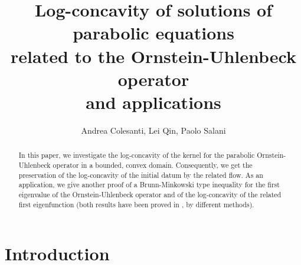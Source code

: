 \documentclass[12pt]{amsart}
\newcommand{\1}{\mathbf 1}
\begin{document}
\title[]{Log-concavity of solutions of parabolic equations\\ related to the Ornstein-Uhlenbeck operator\\ and applications}


\author[Andrea Colesanti, Lei Qin, Paolo Salani ]{Andrea Colesanti, Lei Qin, Paolo Salani}
\address{Dipartimento di Matematica e Informatica ``U. Dini", Universit\`a degli Studi di Firenze}
\address{Institute of Mathematics,
Hunan University, Changsha, 410082, China}
\address{Dipartimento di Matematica e Informatica ``U. Dini", Universit\`a degli Studi di Firenze}

\begin{abstract}
In this paper, we investigate the log-concavity of the kernel for the parabolic Ornstein-Uhlenbeck operator in a bounded, convex domain. Consequently, we get the preservation of the log-concavity of the initial datum by the related flow.
As an application, we give another proof of a Brunn-Minkowski type inequality for the first eigenvalue of the Ornstein-Uhlenbeck operator and of the log-concavity of the related first eigenfunction (both results have been proved in \cite{CFLS24}, by different methods).
\end{abstract}


\maketitle

\baselineskip18pt

\parskip3pt



\section{Introduction}
\end{document}
